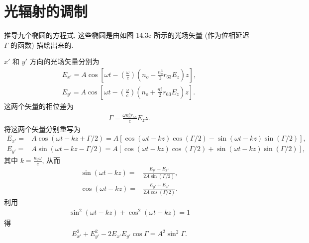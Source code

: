 \documentclass[twoside]{note}
\begin{document}
\fi
\setcounter{chapter}{13}
\chapter{光辐射的调制}
\begin{exe}
    推导九个椭圆的方程式, 这些椭圆是由如图 14.3c 所示的光场矢量 (作为位相延迟 $\Gamma$ 的函数) 描绘出来的.
\end{exe}
\begin{pf}
    $x'$ 和 $y'$ 方向的光场矢量分别为
    \begin{align}
        \label{14.1-1}
        E_{x'}=A\cos\left[\omega t-\left(\frac{\omega}{c}\right)\left(n_o-\frac{n_o^3}{2}r_{63}E_z\right)z\right],\\
        \label{14.1-2}
        E_{y'}=A\cos\left[\omega t-\left(\frac{\omega}{c}\right)\left(n_o+\frac{n_o^3}{2}r_{63}E_z\right)z\right].
    \end{align}
    这两个矢量的相位差为
    \begin{align}
        \Gamma=\frac{\omega n_o^3r_{63}}{c}E_zz.
    \end{align}
    将这两个矢量分别重写为
    \begin{align}
        E_{x'}=&A\cos(\omega t-kz+\Gamma/2)=A[\cos(\omega t-kz)\cos(\Gamma/2)-\sin(\omega t-kz)\sin(\Gamma/2)],\\
        E_{y'}=&A\sin(\omega t-kz-\Gamma/2)=A[\cos(\omega t-kz)\cos(\Gamma/2)+\sin(\omega t-kz)\sin(\Gamma/2)],
    \end{align}
    其中 $k=\frac{n_o\omega}{c}$,
    从而
    \begin{align}
        \sin(\omega t-kz)=&\frac{E_{y'}-E_{x'}}{2A\sin(\Gamma/2)},\\
        \cos(\omega t-kz)=&\frac{E_{y'}+E_{x'}}{2A\cos(\Gamma/2)}.
    \end{align}
    利用
    \begin{align}
        \sin^2(\omega t-kz)+\cos^2(\omega t-kz)=1
    \end{align}
    得
    \begin{align}
        E_{x'}^2+E_{y'}^2-2E_{x'}E_{y'}\cos\Gamma=A^2\sin^2\Gamma.
    \end{align}
\end{pf}
\end{document}
